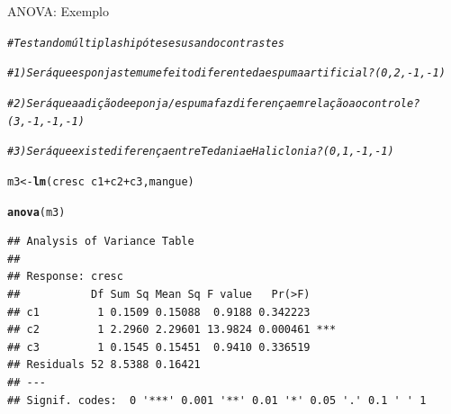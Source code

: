 \documentclass{beamer}\usepackage[]{graphicx}\usepackage[]{color}
\makeatletter
\newcommand{\hlcom}[1]{\textcolor[rgb]{0.678,0.584,0.686}{\textit{#1}}}%
\newcommand{\hlopt}[1]{\textcolor[rgb]{0,0,0}{#1}}%
\newcommand{\hlstd}[1]{\textcolor[rgb]{0.345,0.345,0.345}{#1}}%
\newcommand{\hlkwb}[1]{\textcolor[rgb]{0.69,0.353,0.396}{#1}}%
\newcommand{\hlkwd}[1]{\textcolor[rgb]{0.737,0.353,0.396}{\textbf{#1}}}%
\newenvironment{kframe}{%
 \def\at@end@of@kframe{}%
 \ifinner\ifhmode%
  \def\at@end@of@kframe{\end{minipage}}%
  \begin{minipage}{\columnwidth}%
 \fi\fi%
 \def\FrameCommand##1{\hskip\@totalleftmargin \hskip-\fboxsep
 \colorbox{shadecolor}{##1}\hskip-\fboxsep
     \hskip-\linewidth \hskip-\@totalleftmargin \hskip\columnwidth}%
 \MakeFramed {\advance\hsize-\width
   \@totalleftmargin\z@ \linewidth\hsize
   \@setminipage}}%
 {\par\unskip\endMakeFramed%
 \at@end@of@kframe}
\newenvironment{knitrout}{}{} %
\renewenvironment{knitrout}{\setlength{\topsep}{0mm}}{}
\makeatother
\begin{document}
\begin{frame}[fragile]{ANOVA: Exemplo}

\begin{knitrout}\tiny
{}\color{fgcolor}\begin{kframe}
\begin{alltt}
\hlcom{# Testando múltiplas hipóteses usando contrastes}

\hlcom{# 1) Será que esponjas tem um efeito diferente da espuma artificial? (0,2,-1,-1)}

\hlcom{# 2) Será que a adição de eponja/espuma faz diferença em relação ao controle? (3,-1,-1,-1)}

\hlcom{# 3) Será que existe diferença entre Tedania e Haliclonia? (0,1,-1,-1)}

\hlstd{m3} \hlkwb{<-} \hlkwd{lm}\hlstd{(cresc} \hlopt{~} \hlstd{c1} \hlopt{+} \hlstd{c2} \hlopt{+} \hlstd{c3, mangue)}

\hlkwd{anova}\hlstd{(m3)}
\end{alltt}
\begin{verbatim}
## Analysis of Variance Table
## 
## Response: cresc
##           Df Sum Sq Mean Sq F value   Pr(>F)    
## c1         1 0.1509 0.15088  0.9188 0.342223    
## c2         1 2.2960 2.29601 13.9824 0.000461 ***
## c3         1 0.1545 0.15451  0.9410 0.336519    
## Residuals 52 8.5388 0.16421                     
## ---
## Signif. codes:  0 '***' 0.001 '**' 0.01 '*' 0.05 '.' 0.1 ' ' 1
\end{verbatim}
\end{kframe}
\end{knitrout}

\end{frame}
\end{document}

